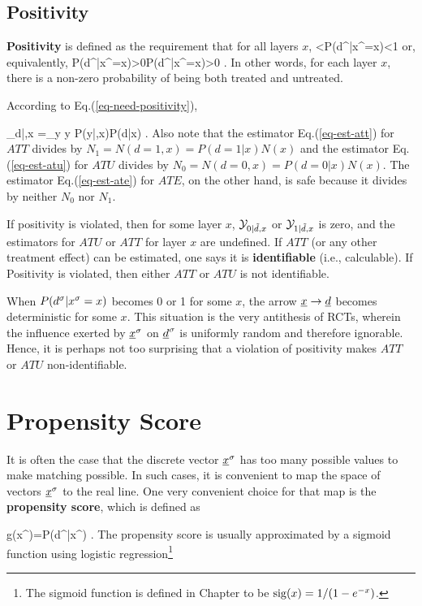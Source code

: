 \subsection{Positivity}


{\bf Positivity} is defined as the
requirement that for all layers $x$,
<P(d^|x^\s=x)<1
\eeq
or, equivalently, 
\beq
P(d^|x^\s=x)>0P(d^|x^\s=x)>0
\;.
\eeq
In other words, 
for each layer $x$,
there is
a non-zero
probability of being both treated 
and untreated.

According to  Eq.(\ref{eq-need-positivity}),

\beq
\caly_{d|\td,x}
=\sum_{y} y P(y|\td,x)P(d|x)
\;.
\eeq
Also note
that the estimator
Eq.(\ref{eq-est-att})
for $ATT$ divides by $N_1=N(d=1,x)=P(d=1|x)N(x)$
and 
the estimator
Eq.(\ref{eq-est-atu})
for $ATU$ divides by $N_0=N(d=0,x)= P(d=0|x)N(x)$.
The estimator
Eq.(\ref{eq-est-ate}) for $ATE$,
on the other hand, 
is safe because 
it divides by neither $N_0$ nor $N_1$.

If positivity is violated,
then 
for some 
layer $x$, 
 ${\cal Y}_{0|{\tilde{d}},x}$ or ${\cal Y}_{1|{\tilde{d}},x}$ 
is zero, 
and the estimators
for $ATU$ or $ATT$ for layer $x$ are
undefined.
If $ATT$ (or any
other treatment effect)  can be estimated,
one says it is {\bf identifiable} (i.e.,
calculable). If Positivity is violated, then
either $ATT$ or $ATU$ is not identifiable.

 

When 
$P(d^\sigma|x^\sigma=x)$ 
becomes 0 or 1 for some $x$,
the arrow
${\underline{x}}\rightarrow{\underline{d}}$
becomes deterministic
for some $x$.
This situation
is
the very 
antithesis
of RCTs,
wherein 
the influence
exerted by ${\underline{x}}^\sigma$ on 
${\underline{d}}^\sigma$ is uniformly
random and therefore ignorable.
Hence, it is perhaps 
not too surprising
that a violation
of positivity makes
$ATT$ or $ATU$
non-identifiable.



\section{Propensity Score}

It is often the case
that the discrete vector ${\underline{x}}^\sigma$
has
too many possible values to make
matching possible.
In such cases, it
is convenient to 
map the space
of vectors
${\underline{x}}^\sigma$
to the real line.
One very  
convenient choice
for that map
is the 
{\bf propensity score},
which is defined as

\beq
g(x^\s)=P(d^|x^\s)
\;.
\eeq
The
propensity
score
is usually
approximated
by a sigmoid
function
using logistic regression\footnote{
The sigmoid function is defined
in Chapter 
to be ${\rm sig} (x) = 1/(1-e^{-x})$.}

